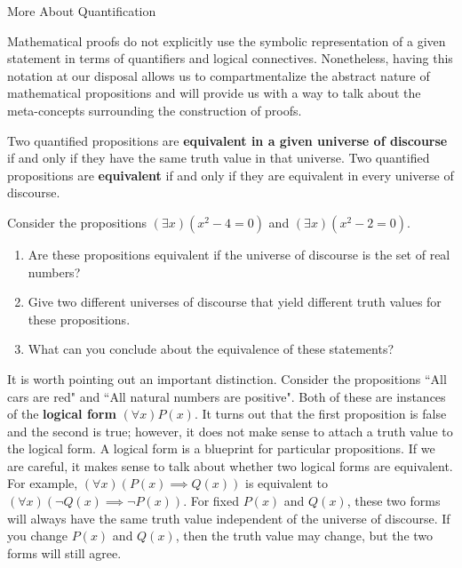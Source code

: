 \begin{section}{More About Quantification}

Mathematical proofs do not explicitly use the symbolic representation of a given statement in terms of quantifiers and logical connectives.  Nonetheless, having this notation at our disposal allows us to compartmentalize the abstract nature of mathematical propositions and will provide us with a way to talk about the meta-concepts surrounding the construction of proofs.

\begin{definition}
Two quantified propositions are \textbf{equivalent in a given universe of discourse} if and only if they have the same truth value in that universe.  Two quantified propositions are \textbf{equivalent} if and only if they are equivalent in every universe of discourse.
\end{definition}

\begin{problem}
Consider the propositions $(\exists x)(x^2-4=0)$ and $(\exists x)(x^2-2=0)$.  
\begin{enumerate}[label=\textrm{(\alph*)}]
\item Are these propositions equivalent if the universe of discourse is the set of real numbers?
\item Give two different universes of discourse that yield different truth values for these propositions.  
\item What can you conclude about the equivalence of these statements?
\end{enumerate}
\end{problem}

It is worth pointing out an important distinction.  Consider the propositions ``All cars are red" and ``All natural numbers are positive".  Both of these are instances of the \textbf{logical form} $(\forall x)P(x)$.  It turns out that the first proposition is false and the second is true; however, it does not make sense to attach a truth value to the logical form.  A logical form is a blueprint for particular propositions.  If we are careful, it makes sense to talk about whether two logical forms are equivalent.  For example, $(\forall x)(P(x)\implies Q(x))$ is equivalent to $(\forall x)(\neg Q(x)\implies \neg P(x))$.  For fixed $P(x)$ and $Q(x)$, these two forms will always have the same truth value independent of the universe of discourse.  If you change $P(x)$ and $Q(x)$, then the truth value may change, but the two forms will still agree.


\end{section}
